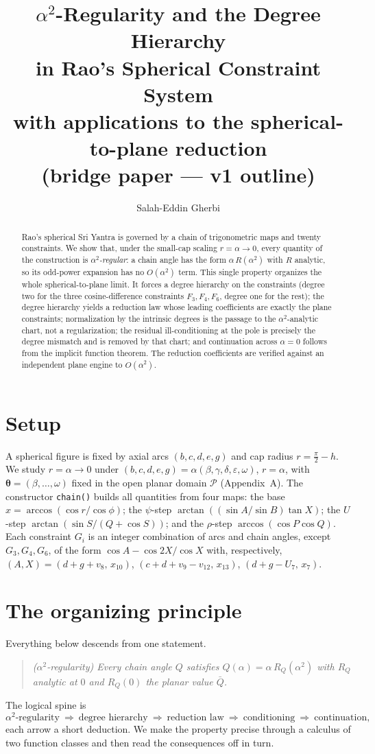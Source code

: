 \documentclass[11pt]{article}
\title{$\alpha^2$-Regularity and the Degree Hierarchy\\
in Rao's Spherical Constraint System\\[5pt]
{\large with applications to the spherical-to-plane reduction}\\[4pt]
{\normalsize (bridge paper --- v1 outline)}}
\author{Salah-Eddin Gherbi}\date{}
\theoremstyle{definition}\newtheorem{definition}{Definition}\newtheorem{remark}{Remark}
\begin{document}
\maketitle

\begin{abstract}\noindent
Rao's spherical Sri Yantra is governed by a chain of trigonometric maps and twenty
constraints. We show that, under the small-cap scaling $r=\alpha\to0$, every quantity
of the construction is \emph{$\alpha^2$-regular}: a chain angle has the form
$\alpha\,R(\alpha^2)$ with $R$ analytic, so its odd-power expansion has no
$O(\alpha^2)$ term. This single property organizes the whole spherical-to-plane
limit. It forces a degree hierarchy on the constraints (degree two for the three
cosine-difference constraints $F_3,F_4,F_6$, degree one for the rest); the degree
hierarchy yields a reduction law whose leading coefficients are exactly the plane
constraints; normalization by the intrinsic degrees is the passage to the
$\alpha^2$-analytic chart, not a regularization; the residual ill-conditioning at the
pole is precisely the degree mismatch and is removed by that chart; and continuation
across $\alpha=0$ follows from the implicit function theorem. The reduction
coefficients are verified against an independent plane engine to $O(\alpha^2)$.
\end{abstract}

\section{Setup}
A spherical figure is fixed by axial arcs $(b,c,d,e,g)$ and cap radius
$r=\tfrac\pi2-h$. We study $r=\alpha\to0$ under
$(b,c,d,e,g)=\alpha(\beta,\gamma,\delta,\varepsilon,\omega)$, $r=\alpha$, with
$\boldsymbol\theta=(\beta,\dots,\omega)$ fixed in the open planar domain $\mathcal P$
(Appendix~A). The constructor \texttt{chain()} builds all quantities from four maps:
the base $x=\arccos(\cos r/\cos\phi)$; the $\psi$-step
$\arctan((\sin A/\sin B)\tan X)$; the $U$-step $\arctan(\sin S/(Q+\cos S))$; and the
$\rho$-step $\arccos(\cos P\cos Q)$. Each constraint $G_i$ is an integer combination
of arcs and chain angles, except $G_3,G_4,G_6$, of the form $\cos A-\cos2X/\cos X$
with, respectively, $(A,X)=(d{+}g{+}v_8,\,x_{10})$, $(c{+}d{+}v_9{-}v_{12},\,x_{13})$,
$(d{+}g{-}U_7,\,x_7)$.

\section{The organizing principle}
Everything below descends from one statement.
\begin{quote}\itshape
($\alpha^2$-regularity) Every chain angle $Q$ satisfies $Q(\alpha)=\alpha\,R_Q(\alpha^2)$
with $R_Q$ analytic at $0$ and $R_Q(0)$ the planar value $\bar Q$.
\end{quote}
The logical spine is
\[
\text{$\alpha^2$-regularity}\ \Rightarrow\ \text{degree hierarchy}\ \Rightarrow\
\text{reduction law}\ \Rightarrow\ \text{conditioning}\ \Rightarrow\ \text{continuation,}
\]
each arrow a short deduction. We make the property precise through a calculus of two
function classes and then read the consequences off in turn.
\end{document}
